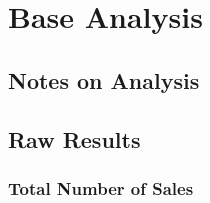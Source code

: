 \documentclass{article}
\begin{document}
    \section{Base Analysis}
    \label{sec:BA}

        \subsection{Notes on Analysis}

            \subsection{Raw Results}


            \subsubsection{Total Number of Sales}
\end{document}
